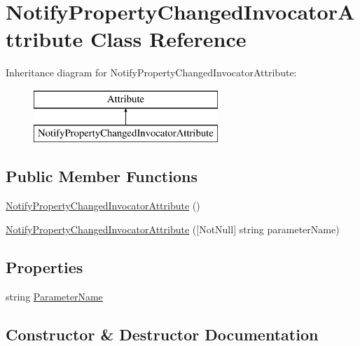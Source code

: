 \hypertarget{class_notify_property_changed_invocator_attribute}{}\section{Notify\+Property\+Changed\+Invocator\+Attribute Class Reference}
\label{class_notify_property_changed_invocator_attribute}
Inheritance diagram for Notify\+Property\+Changed\+Invocator\+Attribute\+:\begin{figure}[H]
\begin{center}
\leavevmode
\includegraphics[height=2.000000cm]{class_notify_property_changed_invocator_attribute}
\end{center}
\end{figure}
\subsection*{Public Member Functions}
\begin{DoxyCompactItemize}
\item 
\mbox{\hyperlink{class_notify_property_changed_invocator_attribute_a74986b0d8e8b310ba92cd038ca58771f}{Notify\+Property\+Changed\+Invocator\+Attribute}} ()
\item 
\mbox{\hyperlink{class_notify_property_changed_invocator_attribute_aaff5942d2d641eb41bdb934a14e46c67}{Notify\+Property\+Changed\+Invocator\+Attribute}} (\mbox{[}Not\+Null\mbox{]} string parameter\+Name)
\end{DoxyCompactItemize}
\subsection*{Properties}
\begin{DoxyCompactItemize}
\item 
string \mbox{\hyperlink{class_notify_property_changed_invocator_attribute_a156a54b467974741191e07b4812442ac}{Parameter\+Name}}
\end{DoxyCompactItemize}


\subsection{Constructor \& Destructor Documentation}
\mbox{\label{class_notify_property_changed_invocator_attribute_a74986b0d8e8b310ba92cd038ca58771f}} 
